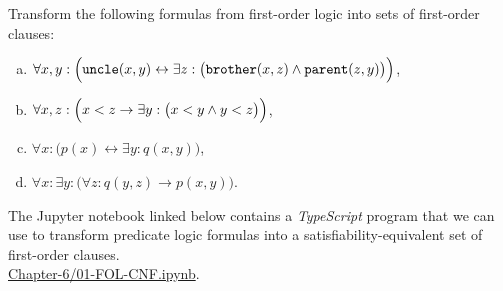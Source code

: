 \exerciseEng
Transform the following formulas from first-order logic into sets of first-order clauses:
\begin{enumerate}[(a)]
\item $\forall x, y: \Bigl(\mathtt{uncle}(x,y) \leftrightarrow
       \exists z: \bigl(\mathtt{brother}(x,z) \wedge \mathtt{parent}(z,y)\bigr)\Bigr)$,
\item $\forall x, z: \Bigl(x < z \rightarrow \exists y: \bigl(x < y \wedge y < z\bigr)\Bigr)$,
\item $\forall x: \bigl(p(x) \leftrightarrow \exists y: q(x,y) \bigr)$, 
\item $\forall x: \exists y: \bigl(\forall z:q(y,z) \rightarrow p(x,y)\bigr)$. \eox
\end{enumerate}%
\vspace*{-0.1cm}

\noindent
The Jupyter notebook linked below contains a \textsl{TypeScript} program that we can use to transform predicate
logic formulas into a satisfiability-equivalent set of first-order clauses. 
\\[0.2cm]
\hspace*{1.3cm}
\href{https://github.com/karlstroetmann/Logic/blob/master/TypeScript/Chapter-6/01-FOL-CNF.ipynb}{Chapter-6/01-FOL-CNF.ipynb}.
\vspace*{0.2cm}

